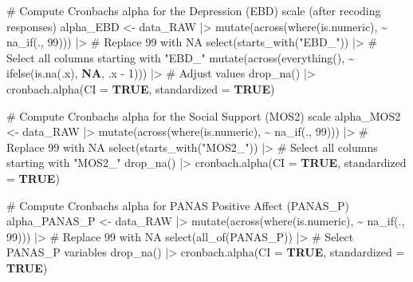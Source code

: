 \documentclass[
  bookmarksnumbered]{article}
\newenvironment{Shaded}{\begin{snugshade}}{\end{snugshade}}
\newcommand{\AttributeTok}[1]{\textcolor[rgb]{0.80,0.80,0.80}{#1}}
\newcommand{\CommentTok}[1]{\textcolor[rgb]{0.50,0.62,0.50}{#1}}
\newcommand{\ConstantTok}[1]{\textcolor[rgb]{0.86,0.64,0.64}{\textbf{#1}}}
\newcommand{\DecValTok}[1]{\textcolor[rgb]{0.86,0.86,0.80}{#1}}
\newcommand{\FunctionTok}[1]{\textcolor[rgb]{0.94,0.94,0.56}{#1}}
\newcommand{\NormalTok}[1]{\textcolor[rgb]{0.80,0.80,0.80}{#1}}
\newcommand{\OtherTok}[1]{\textcolor[rgb]{0.94,0.94,0.56}{#1}}
\newcommand{\SpecialCharTok}[1]{\textcolor[rgb]{0.86,0.64,0.64}{#1}}
\newcommand{\StringTok}[1]{\textcolor[rgb]{0.80,0.58,0.58}{#1}}
\begin{document}
\begin{Shaded}
\begin{Highlighting}[]
\CommentTok{\# Compute Cronbach\textquotesingle{}s alpha for the Depression (EBD) scale (after recoding responses)}
\NormalTok{alpha\_EBD }\OtherTok{\textless{}{-}}\NormalTok{ data\_RAW }\SpecialCharTok{|\textgreater{}} 
  \FunctionTok{mutate}\NormalTok{(}\FunctionTok{across}\NormalTok{(}\FunctionTok{where}\NormalTok{(is.numeric), }\SpecialCharTok{\textasciitilde{}} \FunctionTok{na\_if}\NormalTok{(., }\DecValTok{99}\NormalTok{))) }\SpecialCharTok{|\textgreater{}}  \CommentTok{\# Replace 99 with NA}
  \FunctionTok{select}\NormalTok{(}\FunctionTok{starts\_with}\NormalTok{(}\StringTok{"EBD\_"}\NormalTok{)) }\SpecialCharTok{|\textgreater{}}  \CommentTok{\# Select all columns starting with "EBD\_"}
  \FunctionTok{mutate}\NormalTok{(}\FunctionTok{across}\NormalTok{(}\FunctionTok{everything}\NormalTok{(), }\SpecialCharTok{\textasciitilde{}} \FunctionTok{ifelse}\NormalTok{(}\FunctionTok{is.na}\NormalTok{(.x), }\ConstantTok{NA}\NormalTok{, .x }\SpecialCharTok{{-}} \DecValTok{1}\NormalTok{))) }\SpecialCharTok{|\textgreater{}}  \CommentTok{\# Adjust values}
  \FunctionTok{drop\_na}\NormalTok{() }\SpecialCharTok{|\textgreater{}}
  \FunctionTok{cronbach.alpha}\NormalTok{(}\AttributeTok{CI =} \ConstantTok{TRUE}\NormalTok{, }\AttributeTok{standardized =} \ConstantTok{TRUE}\NormalTok{)}

\CommentTok{\# Compute Cronbach\textquotesingle{}s alpha for the Social Support (MOS2) scale}
\NormalTok{alpha\_MOS2 }\OtherTok{\textless{}{-}}\NormalTok{ data\_RAW }\SpecialCharTok{|\textgreater{}} 
  \FunctionTok{mutate}\NormalTok{(}\FunctionTok{across}\NormalTok{(}\FunctionTok{where}\NormalTok{(is.numeric), }\SpecialCharTok{\textasciitilde{}} \FunctionTok{na\_if}\NormalTok{(., }\DecValTok{99}\NormalTok{))) }\SpecialCharTok{|\textgreater{}}  \CommentTok{\# Replace 99 with NA}
  \FunctionTok{select}\NormalTok{(}\FunctionTok{starts\_with}\NormalTok{(}\StringTok{"MOS2\_"}\NormalTok{)) }\SpecialCharTok{|\textgreater{}}  \CommentTok{\# Select all columns starting with "MOS2\_"}
  \FunctionTok{drop\_na}\NormalTok{() }\SpecialCharTok{|\textgreater{}}
  \FunctionTok{cronbach.alpha}\NormalTok{(}\AttributeTok{CI =} \ConstantTok{TRUE}\NormalTok{, }\AttributeTok{standardized =} \ConstantTok{TRUE}\NormalTok{)}

\CommentTok{\# Compute Cronbach\textquotesingle{}s alpha for PANAS Positive Affect (PANAS\_P)}
\NormalTok{alpha\_PANAS\_P }\OtherTok{\textless{}{-}}\NormalTok{ data\_RAW }\SpecialCharTok{|\textgreater{}} 
  \FunctionTok{mutate}\NormalTok{(}\FunctionTok{across}\NormalTok{(}\FunctionTok{where}\NormalTok{(is.numeric), }\SpecialCharTok{\textasciitilde{}} \FunctionTok{na\_if}\NormalTok{(., }\DecValTok{99}\NormalTok{))) }\SpecialCharTok{|\textgreater{}}  \CommentTok{\# Replace 99 with NA}
  \FunctionTok{select}\NormalTok{(}\FunctionTok{all\_of}\NormalTok{(PANAS\_P)) }\SpecialCharTok{|\textgreater{}}  \CommentTok{\# Select PANAS\_P variables}
  \FunctionTok{drop\_na}\NormalTok{() }\SpecialCharTok{|\textgreater{}}
  \FunctionTok{cronbach.alpha}\NormalTok{(}\AttributeTok{CI =} \ConstantTok{TRUE}\NormalTok{, }\AttributeTok{standardized =} \ConstantTok{TRUE}\NormalTok{)}


\end{Highlighting}
\end{Shaded}
\end{document}
